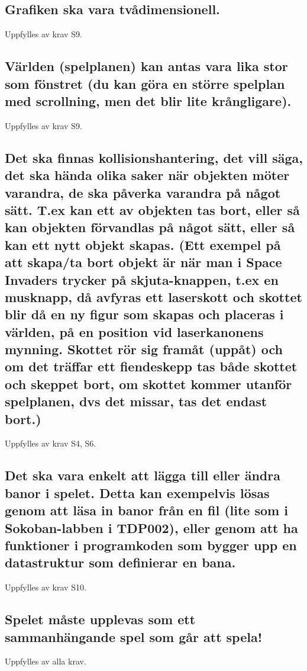 \documentclass{TDP005mall}
\begin{document}
  \subsection{Grafiken ska vara tvådimensionell.}
  Uppfylles av krav S9.
  \subsection{Världen (spelplanen) kan antas vara lika stor som fönstret (du kan göra en större spelplan med scrollning, men det blir lite krångligare).}
  Uppfylles av krav S9.
  \subsection{Det ska finnas kollisionshantering, det vill säga, det ska hända olika saker när objekten möter varandra, de ska påverka varandra på något sätt. T.ex kan ett av objekten tas bort, eller så kan objekten förvandlas på något sätt, eller så kan ett nytt objekt skapas. (Ett exempel på att skapa/ta bort objekt är när man i Space Invaders trycker på skjuta-knappen, t.ex en musknapp, då avfyras ett laserskott och skottet blir då en ny figur som skapas och placeras i världen, på en position vid laserkanonens mynning. Skottet rör sig framåt (uppåt) och om det träffar ett fiendeskepp tas både skottet och skeppet bort, om skottet kommer utanför spelplanen, dvs det missar, tas det endast bort.)}
  Uppfylles av krav S4, S6.
  \subsection{Det ska vara enkelt att lägga till eller ändra banor i spelet. Detta kan exempelvis lösas genom att läsa in banor från en fil (lite som i Sokoban-labben i TDP002), eller genom att ha funktioner i programkoden som bygger upp en datastruktur som definierar en bana.}
  Uppfylles av krav S10.
  \subsection{Spelet måste upplevas som ett sammanhängande spel som går att spela!}
  Uppfylles av alla krav.
\end{document}
